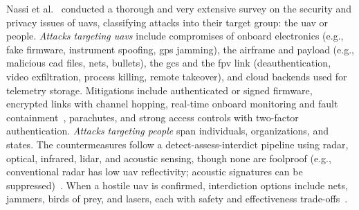 Nassi et al.~\cite{nassi2021sok} conducted a thorough and very extensive survey
on the security and privacy issues of \glspl{uav}, classifying attacks into
their target group: the \gls{uav} or people.
%
\emph{Attacks targeting
  \glspl{uav}} include compromises of onboard electronics (e.g., fake firmware,
instrument spoofing, \gls{gps} jamming), the airframe and payload (e.g., malicious \gls{cad} files, nets, bullets), the \gls{gcs} and the \gls{fpv} link
(deauthentication, video exfiltration, process killing, remote takeover), and
cloud backends used for telemetry storage.
%
Mitigations include authenticated or signed firmware, encrypted links with channel
hopping, real-time onboard monitoring and fault
containment~\cite{mohsan2022towards}, parachutes, and strong access controls
with two-factor authentication.
\emph{Attacks targeting people} span individuals, organizations, and states. The countermeasures follow a
detect-assess-interdict pipeline using radar, optical, infrared, \gls{lidar}, and
acoustic sensing, though none are foolproof (e.g., conventional radar has low
\gls{uav} reflectivity; acoustic signatures can be suppressed)~\cite{sathyamoorthy2015review}.
When a hostile \gls{uav} is
confirmed, interdiction options include nets, jammers, birds of prey, and
lasers, each with safety and effectiveness trade-offs~\cite{nassi2021sok}.

